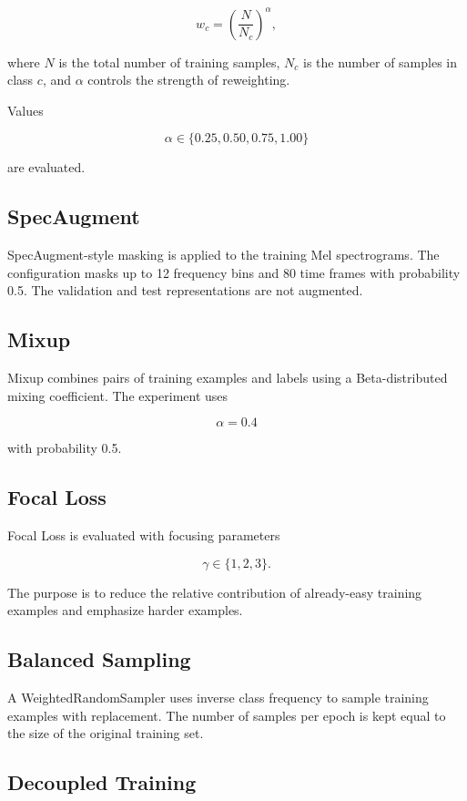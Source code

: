 \documentclass[11pt,a4paper]{article}
\begin{document}
\[
w_c =
\left(\frac{N}{N_c}\right)^\alpha,
\]

where \(N\) is the total number of training samples, \(N_c\) is the number of samples in class \(c\), and \(\alpha\) controls the strength of reweighting.

Values

\[
\alpha\in\{0.25,0.50,0.75,1.00\}
\]

are evaluated.

\subsection{SpecAugment}

SpecAugment-style masking is applied to the training Mel spectrograms. The configuration masks up to 12 frequency bins and 80 time frames with probability 0.5. The validation and test representations are not augmented.

\subsection{Mixup}

Mixup combines pairs of training examples and labels using a Beta-distributed mixing coefficient. The experiment uses

\[
\alpha=0.4
\]

with probability 0.5.

\subsection{Focal Loss}

Focal Loss is evaluated with focusing parameters

\[
\gamma\in\{1,2,3\}.
\]

The purpose is to reduce the relative contribution of already-easy training examples and emphasize harder examples.

\subsection{Balanced Sampling}

A WeightedRandomSampler uses inverse class frequency to sample training examples with replacement. The number of samples per epoch is kept equal to the size of the original training set.

\subsection{Decoupled Training}
\end{document}
